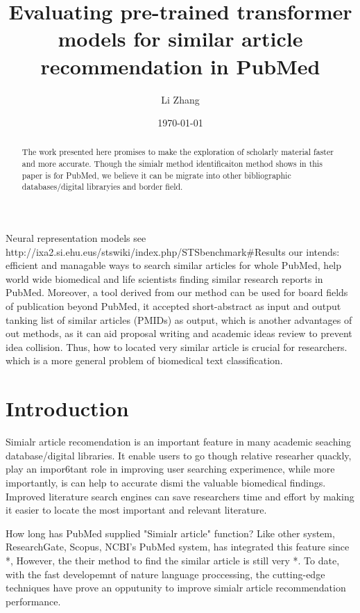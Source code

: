 \documentclass[11pt]{article}
\title{Evaluating pre-trained transformer models for similar article recommendation in PubMed}
\author{Li Zhang}
\date{\today}
\begin{document}
    \maketitle

    \begin{abstract}
        The work presented here promises to make the exploration of scholarly material faster and more accurate.
        Though the simialr method identificaiton method shows in this paper is for PubMed, we believe it can be migrate into other bibliographic databases/digital libraryies and border field.
    \end{abstract}

    \newpage

    Neural representation models  see http://ixa2.si.ehu.eus/stswiki/index.php/STSbenchmark#Results
    our intends: efficient and managable ways to search similar articles for whole PubMed, help world wide biomedical and life scientists finding similar research reports in PubMed.
    Moreover, a tool derived from our method can be used for board fields of publication beyond PubMed, it accepted short-abstract as input and output tanking list of similar articles (PMIDs) as output,
    which is another advantages of out methods, as it can aid proposal writing and academic ideas review to prevent idea collision.
    Thus, how to located very similar article is crucial for researchers. which is a more general problem of biomedical text classification.




    \section{Introduction}
    Simialr article recomendation is an important feature in many academic seaching database/digital libraries. It enable users to go though relative researher quackly, play an impor6tant role in improving user searching experimence, while more importantly, is can help to accurate dismi the valuable biomedical findings.
    Improved literature search engines can save researchers time and effort by making it easier to locate the most important and relevant literature. \cite{2006Text}

    How long has PubMed supplied "Simialr article" function?
    Like other system, ResearchGate, Scopus, NCBI's PubMed system, has integrated this feature since *, However, the their method to find the similar article is still very *. To date, with the fast developemnt of
    nature language proccessing, the cutting-edge techniques have prove an opputunity to improve simialr article recommendation performance.
\end{document}
